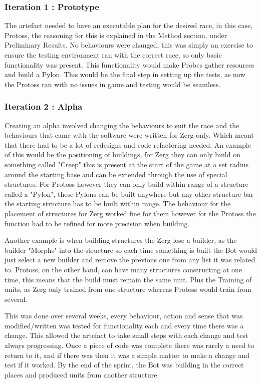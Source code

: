 \documentclass[journal]{IEEEtran}
\begin{document}
	\subsubsection{Iteration 1 : Prototype}
	The artefact needed to have an executable plan for the desired race, in this case, Protoss, the reasoning for this is explained in the Method section, under Preliminary Results. No behaviours were changed, this was simply an exercise to ensure the testing environment ran with the correct race, so only basic functionality was present. This functionality would make Probes gather resources and build a Pylon. This would be the final step in setting up the tests, as now the Protoss ran with no issues in game and testing would be seamless.
	\newline
	
	\subsubsection{Iteration 2 : Alpha}
	Creating an alpha involved changing the behaviours to suit the race and the behaviours that came with the software were written for Zerg only. Which meant that there had to be a lot of redesigns and code refactoring needed. An example of this would be the positioning of buildings, for Zerg they can only build on something called "Creep" this is present at the start of the game at a set radius around the starting base and can be extended through the use of special structures. For Protoss however they can only build within range of a structure called a "Pylon", these Pylons can be built anywhere but any other structure bar the starting structure has to be built within range. The behaviour for the placement of structures for Zerg worked fine for them however for the Protoss the function had to be refined for more precision when building. 
	
	Another example is when building structures the Zerg lose a builder, as the builder "Morphs" into the structure so each time something is built the Bot would just select a new builder and remove the previous one from any list it was related to. Protoss, on the other hand, can have many structures constructing at one time, this means that the build must remain the same unit. Plus the Training of units, as Zerg only trained from one structure whereas Protoss would train from several.
	
	This was done over several weeks, every behaviour, action and sense that was modified/written was tested for functionality each and every time there was a change. This allowed the artefact to take small steps with each change and test always progressing. Once a piece of code was complete there was rarely a need to return to it, and if there was then it was a simple matter to make a change and test if it worked. By the end of the sprint, the Bot was building in the correct places and produced units from another structure.
	\newline
	
\end{document}
